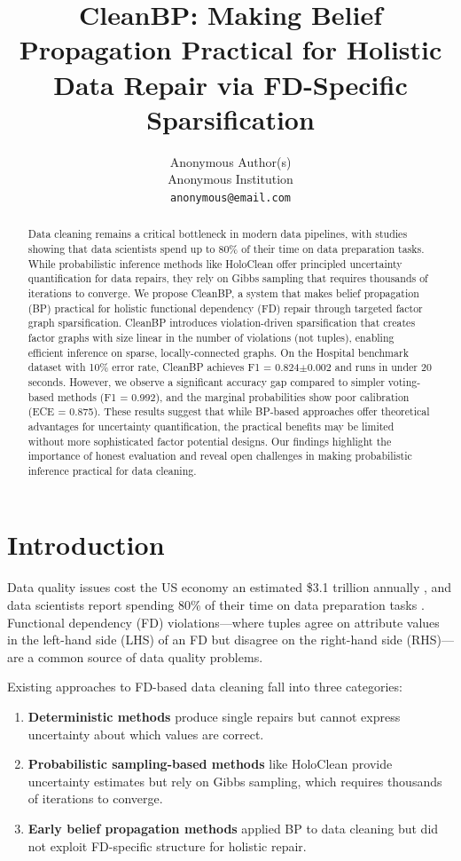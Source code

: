 \documentclass{article}
\title{CleanBP: Making Belief Propagation Practical for Holistic Data Repair via FD-Specific Sparsification}
\author{%
Anonymous Author(s)\\
Anonymous Institution\\
\texttt{anonymous@email.com}
}
\begin{document}
\maketitle

\begin{abstract}
Data cleaning remains a critical bottleneck in modern data pipelines, with studies showing that data scientists spend up to 80\% of their time on data preparation tasks. While probabilistic inference methods like HoloClean offer principled uncertainty quantification for data repairs, they rely on Gibbs sampling that requires thousands of iterations to converge. We propose CleanBP, a system that makes belief propagation (BP) practical for holistic functional dependency (FD) repair through targeted factor graph sparsification. CleanBP introduces violation-driven sparsification that creates factor graphs with size linear in the number of violations (not tuples), enabling efficient inference on sparse, locally-connected graphs. On the Hospital benchmark dataset with 10\% error rate, CleanBP achieves F1 = 0.824$\pm$0.002 and runs in under 20 seconds. However, we observe a significant accuracy gap compared to simpler voting-based methods (F1 = 0.992), and the marginal probabilities show poor calibration (ECE = 0.875). These results suggest that while BP-based approaches offer theoretical advantages for uncertainty quantification, the practical benefits may be limited without more sophisticated factor potential designs. Our findings highlight the importance of honest evaluation and reveal open challenges in making probabilistic inference practical for data cleaning.
\end{abstract}

\section{Introduction}

Data quality issues cost the US economy an estimated \$3.1 trillion annually \citep{redman2016bad}, and data scientists report spending 80\% of their time on data preparation tasks \citep{hameed2020data}. Functional dependency (FD) violations---where tuples agree on attribute values in the left-hand side (LHS) of an FD but disagree on the right-hand side (RHS)---are a common source of data quality problems.

Existing approaches to FD-based data cleaning fall into three categories:
\begin{enumerate}
    \item \textbf{Deterministic methods} \citep{kolahi2009approximating} produce single repairs but cannot express uncertainty about which values are correct.
    \item \textbf{Probabilistic sampling-based methods} like HoloClean \citep{rekatsinas2017holoclean} provide uncertainty estimates but rely on Gibbs sampling, which requires thousands of iterations to converge.
    \item \textbf{Early belief propagation methods} \citep{chu2005data, mayfield2010eracer} applied BP to data cleaning but did not exploit FD-specific structure for holistic repair.
\end{enumerate}
\end{document}
